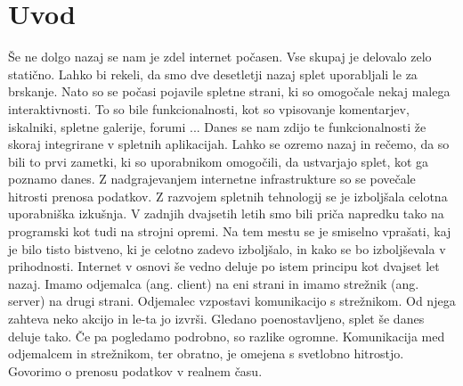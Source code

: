 \documentclass[a4paper, 12pt, twoside]{book}
\begin{document}
\mainmatter
\setcounter{page}{1}

\chapter{Uvod}

Še ne dolgo nazaj se nam je zdel internet počasen. Vse skupaj je delovalo zelo statično. Lahko bi rekeli, da smo dve desetletji nazaj splet uporabljali le za brskanje. Nato so se počasi pojavile spletne strani, ki so omogočale nekaj malega interaktivnosti. To so bile funkcionalnosti, kot so vpisovanje komentarjev, iskalniki, spletne galerije, forumi ... Danes se nam zdijo te funkcionalnosti že skoraj integrirane v spletnih aplikacijah. Lahko se ozremo nazaj in rečemo, da so bili to prvi zametki, ki so uporabnikom omogočili, da ustvarjajo splet, kot ga poznamo danes. Z nadgrajevanjem internetne infrastrukture so se povečale hitrosti prenosa podatkov. Z razvojem spletnih tehnologij se je izboljšala celotna uporabniška izkušnja. V zadnjih dvajsetih letih smo bili priča napredku tako na programski kot tudi na strojni opremi. Na tem mestu se je smiselno vprašati, kaj je bilo tisto bistveno, ki je celotno zadevo izboljšalo, in kako se bo izboljševala v prihodnosti. Internet v osnovi še vedno deluje po istem principu kot dvajset let nazaj. Imamo odjemalca (ang. client) na eni strani in imamo strežnik (ang. server) na drugi strani. Odjemalec vzpostavi komunikacijo s strežnikom. Od njega zahteva neko akcijo in le-ta jo izvrši. Gledano poenostavljeno, splet še danes deluje tako. Če pa pogledamo podrobno, so razlike ogromne. Komunikacija med odjemalcem in strežnikom, ter obratno, je omejena s svetlobno hitrostjo. Govorimo o prenosu podatkov v realnem času.
\end{document}
